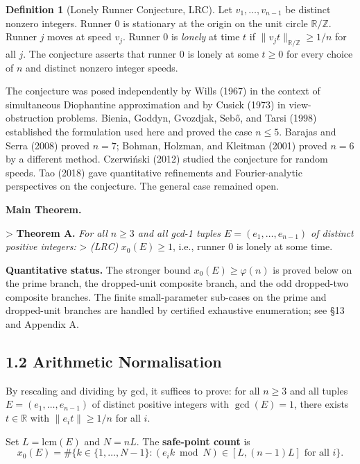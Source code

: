 \documentclass[11pt,a4paper]{article}
\theoremstyle{plain}
\theoremstyle{definition}
\newtheorem{definition}[theorem]{Definition}
\theoremstyle{remark}
\begin{document}
\begin{definition}[Lonely Runner Conjecture, LRC]
Let $v_1, \ldots, v_{n-1}$ be distinct nonzero integers. Runner 0 is stationary at the origin on the unit circle $\mathbb{R}/\mathbb{Z}$. Runner $j$ moves at speed $v_j$. Runner 0 is \textit{lonely} at time $t$ if $\|v_j t\|_{\mathbb{R}/\mathbb{Z}} \geq 1/n$ for all $j$. The conjecture asserts that runner 0 is lonely at some $t \geq 0$ for every choice of $n$ and distinct nonzero integer speeds.

The conjecture was posed independently by Wills (1967) in the context of simultaneous Diophantine approximation and by Cusick (1973) in view-obstruction problems. Bienia, Goddyn, Gvozdjak, Sebő, and Tarsi (1998) established the formulation used here and proved the case $n \leq 5$. Barajas and Serra (2008) proved $n = 7$; Bohman, Holzman, and Kleitman (2001) proved $n = 6$ by a different method. Czerwiński (2012) studied the conjecture for random speeds. Tao (2018) gave quantitative refinements and Fourier-analytic perspectives on the conjecture. The general case remained open.

\textbf{Main Theorem.}

> \textbf{Theorem A.} \textit{For all $n \geq 3$ and all gcd-1 tuples $E = (e_1, \ldots, e_{n-1})$ of distinct positive integers:}
> \textit{(LRC)} $x_0(E) \geq 1$, i.e., runner 0 is lonely at some time.

\textbf{Quantitative status.} The stronger bound $x_0(E) \geq \varphi(n)$ is proved below on the prime branch, the dropped-unit composite branch, and the odd dropped-two composite branches. The finite small-parameter sub-cases on the prime and dropped-unit branches are handled by certified exhaustive enumeration; see §13 and Appendix A.

\end{definition}


\subsection{1.2 Arithmetic Normalisation}


By rescaling and dividing by gcd, it suffices to prove: for all $n \geq 3$ and all tuples $E = (e_1, \ldots, e_{n-1})$ of distinct positive integers with $\gcd(E) = 1$, there exists $t \in \mathbb{R}$ with $\|e_i t\| \geq 1/n$ for all $i$.

Set $L = \mathrm{lcm}(E)$ and $N = nL$. The \textbf{safe-point count} is
\[x_0(E) = \#\bigl\{k \in \{1, \ldots, N-1\} : (e_i k \bmod N) \in [L, (n-1)L] \text{ for all } i\bigr\}.\]
\end{document}
